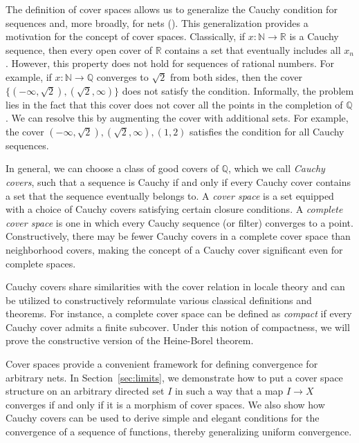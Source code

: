 \documentclass[reqno]{amsart}
\theoremstyle{definition}
\theoremstyle{remark}
\numberwithin{figure}{section}
\begin{document}
The definition of cover spaces allows us to generalize the Cauchy condition for sequences and, more broadly, for nets ().
This generalization provides a motivation for the concept of cover spaces.
Classically, if $x : \mathbb{N} \to \mathbb{R}$ is a Cauchy sequence, then every open cover of $\mathbb{R}$ contains a set that eventually includes all $x_n$.
However, this property does not hold for sequences of rational numbers.
For example, if $x : \mathbb{N} \to \mathbb{Q}$ converges to $\sqrt{2}$ from both sides, then the cover $\{ (-\infty,\sqrt{2}), (\sqrt{2},\infty) \}$ does not satisfy the condition.
Informally, the problem lies in the fact that this cover does not cover all the points in the completion of $\mathbb{Q}$.
We can resolve this by augmenting the cover with additional sets.
For example, the cover ${ (-\infty, \sqrt{2}), (\sqrt{2}, \infty), (1,2) }$ satisfies the condition for all Cauchy sequences.

In general, we can choose a class of good covers of $\mathbb{Q}$, which we call \emph{Cauchy covers},
such that a sequence is Cauchy if and only if every Cauchy cover contains a set that the sequence eventually belongs to.
A \emph{cover space} is a set equipped with a choice of Cauchy covers satisfying certain closure conditions.
A \emph{complete cover space} is one in which every Cauchy sequence (or filter) converges to a point.
Constructively, there may be fewer Cauchy covers in a complete cover space than neighborhood covers, making the concept of a Cauchy cover significant even for complete spaces.

Cauchy covers share similarities with the cover relation in locale theory and can be utilized to constructively reformulate various classical definitions and theorems.
For instance, a complete cover space can be defined as \emph{compact} if every Cauchy cover admits a finite subcover.
Under this notion of compactness, we will prove the constructive version of the Heine-Borel theorem.

Cover spaces provide a convenient framework for defining convergence for arbitrary nets.
In Section~\ref{sec:limits}, we demonstrate how to put a cover space structure on an arbitrary directed set $I$ in such a way that a map $I \to X$ converges if and only if it is a morphism of cover spaces.
We also show how Cauchy covers can be used to derive simple and elegant conditions for the convergence of a sequence of functions, thereby generalizing uniform convergence.
\end{document}
